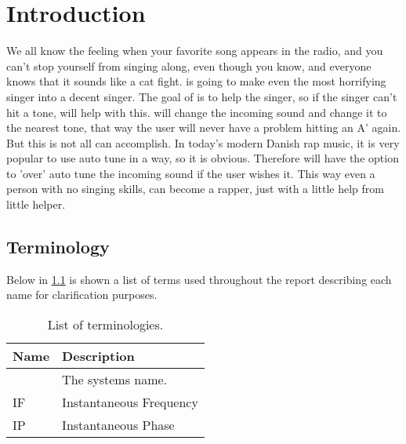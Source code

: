 
\chapter{Introduction}
\label{sec:introduction}
We all know the feeling when your favorite song appears in the radio, and you can't stop yourself from singing along, even though you know, and everyone knows that it sounds like a cat fight.
\systemName is going to make even the most horrifying singer into a decent singer.
The goal of \systemName is to help the singer, so if the singer can't hit a tone, \systemName will help with this. \systemName will change the incoming sound and change it to the nearest tone, that way the user will never have a problem hitting an A' again.
But this is not all \systemName can accomplish. In today's modern Danish rap music, it is very popular to use auto tune in a way, so it is obvious.
Therefore \systemName will have the option to 'over' auto tune the incoming sound if the user wishes it.
This way even a person with no singing skills, can become a rapper, just with a little help from little helper.


\section{Terminology}
\label{sec:terminology}
Below in \cref{tab:terminology} is shown a list of terms used throughout the report describing each name for clarification purposes.

\begin{table}[H]
	\centering
	\begin{tabularx}{0.8\textwidth}{l X}
		\toprule
		\textbf{Name} & \textbf{Description} \\
		\midrule
		\systemName & The systems name. \\
		IF & Instantaneous Frequency \\
		IP & Instantaneous Phase \\
		\bottomrule
	\end{tabularx}
	\caption{List of terminologies.}
	\label{tab:terminology}
\end{table}